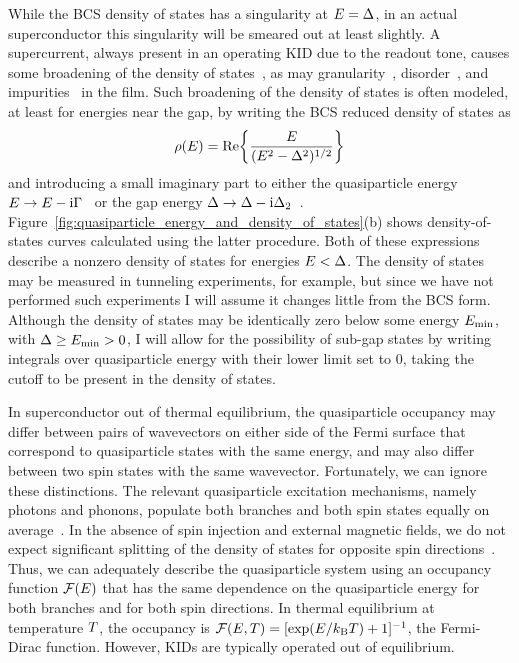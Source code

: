 While the BCS density of states has a singularity at $E = \Delta$, in an actual superconductor this singularity will be smeared out at least slightly.
A supercurrent, always present in an operating KID due to the readout tone, causes some broadening of the density of states~\autocite{Anthore2003PRL}, as may granularity~\autocite{Dynes1984PRL}, disorder~\autocite{Driessen2012PRL}, and impurities~\autocite{ONeil2008PRL, ONeil2010JAP} in the film.
Such broadening of the density of states is often modeled, at least for energies near the gap, by writing the BCS reduced density of states as
\begin{equation}
\rho(E)
  =
  \Re{\frac{E}{(E^2 - \Delta^2)^{1/2}}}
\end{equation}
and introducing a small imaginary part to either the quasiparticle energy
$E \rightarrow E - \mathrm{i} \Gamma$~\autocite{Dynes1984PRL}
or the gap energy
$\Delta \rightarrow \Delta - \mathrm{i} \Delta_2$~\autocite{Mitrovic2008JPCM}.
Figure~\ref{fig:quasiparticle_energy_and_density_of_states}(b) shows density-of-states curves calculated using the latter procedure.
Both of these expressions describe a nonzero density of states for energies $E < \Delta$.
The density of states may be measured in tunneling experiments, for example, but since we have not performed such experiments I will assume it changes little from the BCS form.
Although the density of states may be identically zero below some energy $E_\mathrm{min}$, with $\Delta \ge E_\mathrm{min} > 0$, I will allow for the possibility of sub-gap states by writing integrals over quasiparticle energy with their lower limit set to 0, taking the cutoff to be present in the density of states.

In superconductor out of thermal equilibrium, the quasiparticle occupancy may differ between pairs of wavevectors on either side of the Fermi surface that correspond to quasiparticle states with the same energy, and may also differ between two spin states with the same wavevector.
Fortunately, we can ignore these distinctions.
The relevant quasiparticle excitation mechanisms, namely photons and phonons, populate both branches and both spin states equally on average~\autocite{Tinkham2004}.
In the absence of spin injection and external magnetic fields, we do not expect significant splitting of the density of states for opposite spin directions~\autocite{Meservey1970PRL}.
Thus, we can adequately describe the quasiparticle system using an occupancy function $\mathcal{F}(E)$ that has the same dependence on the quasiparticle energy for both branches and for both spin directions.
In thermal equilibrium at temperature $T$, the occupancy is 
$\mathcal{F}(E, T) = [\exp(E / k_\mathrm{B} T) + 1]^{-1}$,
the Fermi-Dirac function.
However, KIDs are typically operated out of equilibrium.

